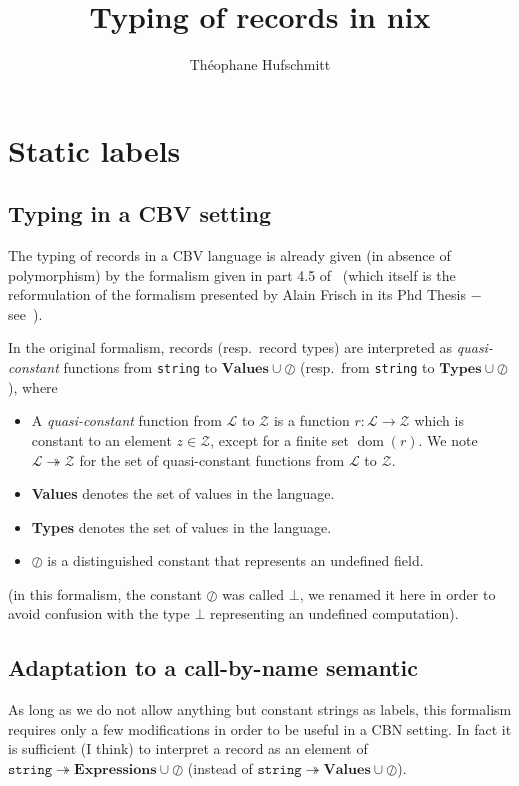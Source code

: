 \documentclass{article}
\title{Typing of records in nix}
\author{Théophane Hufschmitt}
\date{}
\newcommand{\ty}[1]{\texttt{#1}}
\newcommand{\set}[1]{\ensuremath{\mathcal{#1}}}
\newcommand{\undef}{\oslash}
\newcommand{\quasiconst}{\twoheadrightarrow}
\DeclareMathOperator\dom{dom}
\newcommand{\Γ}{\Gamma}
\newcommand{\τ}{\tau}
\begin{document}
\maketitle{}

\section{Static labels}
\subsection{Typing in a CBV setting}
The typing of records in a CBV language is already given (in absence of
polymorphism) by the formalism given in part 4.5 of~\cite{Cas15} (which itself
is the reformulation of the formalism presented by Alain Frisch in its Phd
Thesis − see~\cite{Fri04}).

In the original formalism, records (resp.\ record types) are interpreted as
\emph{quasi-constant} functions from \ty{string} to $\textbf{Values} \cup
\undef$ (resp.\ from \ty{string} to $\textbf{Types} \cup \undef$), where
\begin{itemize}
  \item A \emph{quasi-constant} function from \set{L} to \set{Z} is a
    function $r: \set{L} \rightarrow \set{Z}$ which is constant to an element
    $z \in \set{Z}$, except for a finite set $\dom(r)$. We note $\set{L}
    \quasiconst \set{Z}$ for the set of quasi-constant functions from \set{L}
    to \set{Z}.
  \item \textbf{Values} denotes the set of values in the language.
  \item \textbf{Types} denotes the set of values in the language.
  \item $\undef$ is a distinguished constant that represents an undefined
    field.
\end{itemize}

(in this formalism, the constant $\undef$ was called $\bot$, we renamed it here
in order to avoid confusion with the type $\bot$ representing an undefined
computation).

\subsection{Adaptation to a call-by-name semantic}

As long as we do not allow anything but constant strings as labels, this
formalism requires only a few modifications in order to be useful in a CBN
setting. In fact it is sufficient (I think) to interpret a record as an element
of $\ty{string} \quasiconst \textbf{Expressions} \cup \undef$ (instead of
$\ty{string} \quasiconst \textbf{Values} \cup \undef$).
\end{document}
